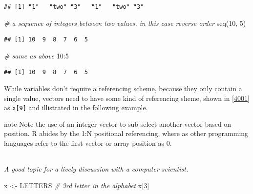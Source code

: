 \documentclass[
]{book}
\newenvironment{Shaded}{\begin{snugshade}}{\end{snugshade}}
\newcommand{\CommentTok}[1]{\textcolor[rgb]{0.56,0.35,0.01}{\textit{#1}}}
\newcommand{\DecValTok}[1]{\textcolor[rgb]{0.00,0.00,0.81}{#1}}
\newcommand{\FunctionTok}[1]{\textcolor[rgb]{0.00,0.00,0.00}{#1}}
\newcommand{\NormalTok}[1]{#1}
\newcommand{\OtherTok}[1]{\textcolor[rgb]{0.56,0.35,0.01}{#1}}
\newcommand{\SpecialCharTok}[1]{\textcolor[rgb]{0.00,0.00,0.00}{#1}}
\begin{document}
\begin{verbatim}
## [1] "1"   "two" "3"   "1"   "two" "3"
\end{verbatim}

\begin{Shaded}
\begin{Highlighting}[]
\CommentTok{\# a sequence of integers between two values, in this case reverse order}
\FunctionTok{seq}\NormalTok{(}\DecValTok{10}\NormalTok{, }\DecValTok{5}\NormalTok{)}
\end{Highlighting}
\end{Shaded}

\begin{verbatim}
## [1] 10  9  8  7  6  5
\end{verbatim}

\begin{Shaded}
\begin{Highlighting}[]
\CommentTok{\# same as above}
\DecValTok{10}\SpecialCharTok{:}\DecValTok{5}
\end{Highlighting}
\end{Shaded}

\begin{verbatim}
## [1] 10  9  8  7  6  5
\end{verbatim}

While variables don't require a referencing scheme, because they only contain a single value, vectors need to have some kind of referencing sheme, shown in \ref{4001} as \texttt{x{[}9{]}} and illistrated in the following example.

\begin{infobox}{note}
Note the use of an integer vector to sub-select another vector based on position. R abides by the 1:N positional referencing, where as other programming languages refer to the first vector or array position as 0.\\
\strut \\
\emph{A good topic for a lively discussion with a computer scientist.}

\end{infobox}

\hfill\break

\begin{Shaded}
\begin{Highlighting}[]
\NormalTok{x }\OtherTok{\textless{}{-}}\NormalTok{ LETTERS}
\CommentTok{\# 3rd letter in the alphabet}
\NormalTok{x[}\DecValTok{3}\NormalTok{]}
\end{Highlighting}
\end{Shaded}
\end{document}
